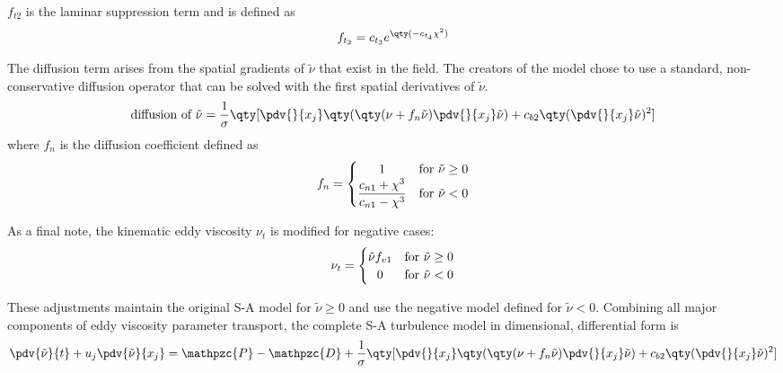 \noindent
$f_{t2}$ is the laminar suppression term and is defined as
%
$$ f_{t_2} = c_{t_3}e^{\qty(-c_{t_4}\chi^2)} $$
%

The diffusion term arises from the spatial gradients of $\tilde{\nu}$ that exist in the field. The creators of the model chose to use a standard, non-conservative diffusion operator that can be solved with the first spatial derivatives of $\tilde{\nu}$. 
%
$$ \textrm{diffusion of }\tilde{\nu} = \dfrac{1}{\sigma}\qty[\pdv{}{x_j}\qty(\qty(\nu + f_n\tilde\nu)\pdv{}{x_j}\tilde\nu) + c_{b2}\qty(\pdv{}{x_j}\tilde\nu)^2] $$
%
where $f_n$ is the diffusion coefficient defined as
%
\begin{align}
f_n = \begin{cases}
  \hfil 1 & $for $ \tilde\nu \geq 0 \\
  \dfrac{c_{n1}+\chi^3}{c_{n1}-\chi^3}      & $for $ \tilde\nu < 0
\end{cases}
\end{align}

As a final note, the kinematic eddy viscosity $\nu_t$ is modified for negative cases:
%
\begin{align}
\nu_t = \begin{cases}
  \tilde\nu f_{v1} & $for $ \tilde\nu \geq 0 \\
  \hfil 0     & $for $ \tilde\nu < 0
\end{cases}
\end{align}

These adjustments maintain the original S-A model for $\tilde\nu \geq 0$ and use the negative model defined for $\tilde\nu < 0$. Combining all major components of eddy viscosity parameter transport, the complete S-A turbulence model in dimensional, differential form is
%
$$ \pdv{\tilde\nu}{t} + u_j \pdv{\tilde\nu}{x_j} = \mathpzc{P} - \mathpzc{D} + \dfrac{1}{\sigma}\qty[\pdv{}{x_j}\qty(\qty(\nu + f_n\tilde\nu)\pdv{}{x_j}\tilde\nu) + c_{b2}\qty(\pdv{}{x_j}\tilde\nu)^2] $$


